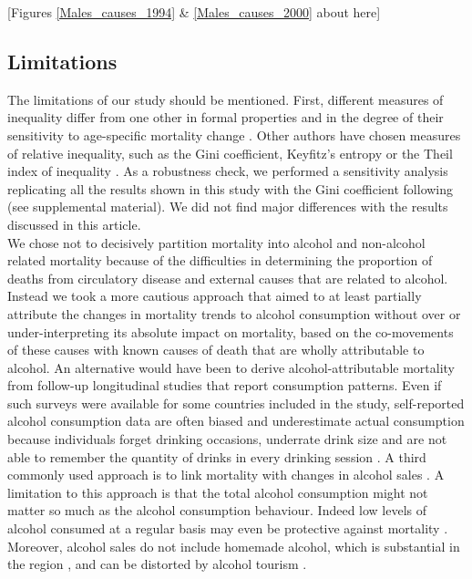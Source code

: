 \documentclass{article}
\begin{document}
\begin{spacing}{1.5}
\begin{center}
[Figures \ref{Males_causes_1994} \& \ref{Males_causes_2000} about here]\\
\end{center}


\subsection*{Limitations} 
The limitations of our study should be mentioned. First, different measures of inequality differ from one other in formal properties and in the degree of their sensitivity to age-specific mortality change \citep{vanraalte2013}. Other authors have chosen measures of relative inequality, such as the Gini coefficient, Keyfitz's entropy or the Theil index of inequality \citep{shkolnikov2003,moser2005world,smits2009,colchero2016emergence}. As a robustness check, we performed a sensitivity analysis replicating all the results shown in this study with the Gini coefficient following \citet{shkolnikov2003} (see supplemental material). We did not find major differences with the results discussed in this article. \\

\textcolor[rgb]{0,0.58,0}{We chose not to decisively partition mortality into alcohol and non-alcohol related mortality because of the difficulties in determining the proportion of deaths from circulatory disease and external causes that are related to alcohol. Instead we took a more cautious approach that aimed to at least partially attribute the changes in mortality trends to alcohol consumption without over or under-interpreting its absolute impact on mortality, based on the co-movements of these causes with known causes of death that are wholly attributable to alcohol.} An alternative would have been to derive alcohol-attributable mortality from follow-up longitudinal studies that report consumption patterns. Even if such surveys were available for some countries included in the study, self-reported alcohol consumption data are often biased and underestimate actual consumption because individuals forget drinking occasions, underrate drink size and are not able to remember the quantity of drinks in every drinking session \citep{livingston2015underreporting,bellis2009off}. A third commonly used approach is to link mortality with changes in alcohol sales \citep{ evgeny2010beverage}. A limitation to this approach is that the total alcohol consumption might not matter so much as the alcohol consumption behaviour. Indeed low levels of alcohol consumed at a regular basis may even be protective against mortality \citep{bell2017,rehm2010relation, klatsky1974alcohol, roerecke2014alcohol}. Moreover, alcohol sales do not include homemade alcohol, which is substantial in the region \citep{popova2007comparing,mckee2005composition}, and can be distorted by alcohol tourism \citep{makela2009weakening,rabinovich2009affordability}. \\


\end{spacing}
\end{document}

